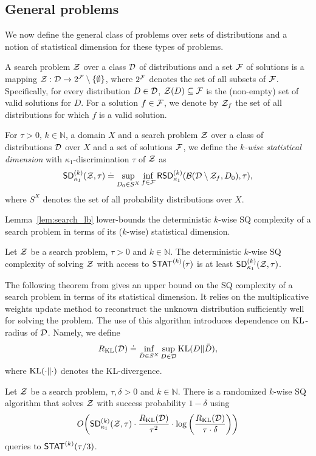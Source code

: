 \subsection{General problems}
We now define the general class of problems over sets of distributions and a notion of statistical dimension for these types of problems.
\begin{defn}
A search problem $\mathcal{Z}$ over a class $\mathcal{D}$ of distributions and a set $\mathcal{F}$ of solutions is a mapping $\mathcal{Z}: \mathcal{D} \to 2^{\mathcal{F}} \setminus \{\emptyset\}$, where $2^{\mathcal{F}}$ denotes the set of all subsets of $\mathcal{F}$. Specifically, for every distribution $D \in \mathcal{D}$, $\mathcal{Z}(D) \subseteq \mathcal{F}$ is the (non-empty) set of valid solutions for $D$. For a solution $f \in \mathcal{F}$, we denote by $\mathcal{Z}_f$ the set of all distributions for which $f$ is a valid solution.
\end{defn}

\begin{defn}\label{def:search_SD}
For $\tau > 0$, $k \in \mathbb{N}$, a domain $X$ and a search problem $\mathcal{Z}$ over a class of distributions $\mathcal{D}$ over $X$ and a set of solutions $\mathcal{F}$, we define the \emph{$k$-wise statistical dimension} with $\kappa_1$-discrimination $\tau$ of $\mathcal{Z}$ as
\begin{equation*}
\mathsf{SD}^{(k)}_{\kappa_1}(\mathcal{Z},\tau) \doteq \sup_{D_0 \in S^X} \inf_{f \in \mathcal{F}} \mathsf{RSD}^{(k)}_{\kappa_1}(\mathcal{B}(\mathcal{D} \setminus \mathcal{Z}_f, D_0), \tau),
\end{equation*}
where $S^X$ denotes the set of all probability distributions over $X$.
\end{defn}

Lemma~\ref{lem:search_lb} lower-bounds the deterministic $k$-wise SQ complexity of a search problem in terms of its ($k$-wise) statistical dimension.
\begin{theorem}\label{lem:search_lb}
Let $\mathcal{Z}$ be a search problem, $\tau > 0$ and $k \in \mathbb{N}$. The deterministic $k$-wise SQ complexity of solving $\mathcal{Z}$ with access to $\mathsf{STAT}^{(k)}(\tau)$ is at least $\mathsf{SD}^{(k)}_{\kappa_1}(\mathcal{Z},\tau)$.
\end{theorem}

The following theorem from \cite{Feldman:16sqd} gives an upper bound on the SQ complexity of a search problem in terms of its statistical dimension. It relies on the multiplicative weights update method to reconstruct the unknown distribution sufficiently well for solving the problem. The use of this algorithm introduces dependence on ${\mathrm{KL}}$-radius of $\mathcal{D}$. Namely, we define
$$R_{\mathrm{KL}}(\mathcal{D}) \doteq \inf_{\bar D \in S^X } \sup_{D\in \mathcal{D}} {\mathrm{KL}}(D\|\bar D), $$
where ${\mathrm{KL}}(\cdot \| \cdot)$ denotes the KL-divergence.
\begin{theorem}
\label{lem:search_ub}
Let $\mathcal{Z}$ be a search problem, $\tau, \delta > 0$ and $k \in \mathbb{N}$. There is a randomized $k$-wise SQ algorithm that solves $\mathcal{Z}$ with success probability $1-\delta$ using
$$ O\bigg(\mathsf{SD}^{(k)}_{\kappa_1}(\mathcal{Z},\tau) \cdot \frac{R_{\mathrm{KL}}(\mathcal{D})}{\tau^2} \cdot \log\bigg( \frac{R_{\mathrm{KL}}(\mathcal{D})}{\tau \cdot \delta}\bigg) \bigg)$$
queries to $\mathsf{STAT}^{(k)}(\tau/3)$.
\end{theorem}

